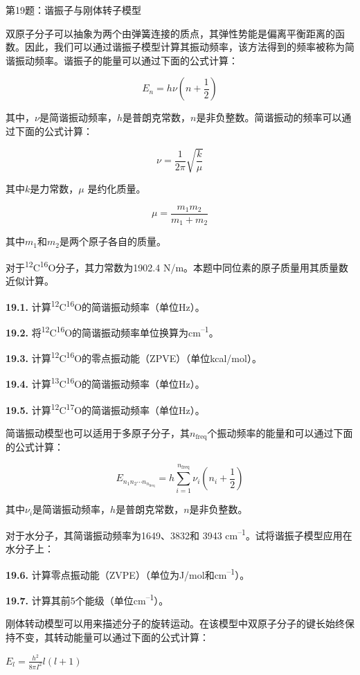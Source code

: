 第19题：谐振子与刚体转子模型

双原子分子可以抽象为两个由弹簧连接的质点，其弹性势能是偏离平衡距离的函数。因此，我们可以通过谐振子模型计算其振动频率，该方法得到的频率被称为简谐振动频率。谐振子的能量可以通过下面的公式计算：

\[E_n=h\nu (n+\frac{1}{2})\]

其中，\(\nu\)是简谐振动频率，\(h\)是普朗克常数，\(n\)是非负整数。简谐振动的频率可以通过下面的公式计算：

\[\nu = \frac{1}{2\pi} \sqrt{\frac{k}{\mu}}\]

其中\(k\)是力常数，\(\mu\) 是约化质量。

\[\mu=\frac{m_1m_2}{m_1+m_2}\]

其中\(m_1\)和\(m_2\)是两个原子各自的质量。

对于\textsuperscript{12}C\textsuperscript{16}O分子，其力常数为1902.4
N/m。本题中同位素的原子质量用其质量数近似计算。

\textbf{19.1.}
计算\textsuperscript{12}C\textsuperscript{16}O的简谐振动频率（单位Hz）。

\textbf{19.2.}
将\textsuperscript{12}C\textsuperscript{16}O的简谐振动频率单位换算为cm\textsuperscript{--1}。

\textbf{19.3.}
计算\textsuperscript{12}C\textsuperscript{16}O的零点振动能（ZPVE）（单位kcal/mol）。

\textbf{19.4.}
计算\textsuperscript{13}C\textsuperscript{16}O的简谐振动频率（单位Hz）。

\textbf{19.5.}
计算\textsuperscript{12}C\textsuperscript{17}O的简谐振动频率（单位Hz）。

简谐振动模型也可以适用于多原子分子，其\(n_{\mathrm{freq}}\)个振动频率的能量和可以通过下面的公式计算：

\[E_{n_1n_2\cdots n_{n_{\mathrm{freq}}}} = h\sum^{n_{\mathrm{freq}}}_{i=1} \nu_i
(n_i + \frac{1}{2})\]

其中\(\nu_i\)是简谐振动频率，\(h\)是普朗克常数，\(n\)是非负整数。

对于水分子，其简谐振动频率为1649、3832和 3943
cm\textsuperscript{--1}。试将谐振子模型应用在水分子上：

\textbf{19.6.}
计算零点振动能（ZVPE）（单位为J/mol和cm\textsuperscript{--1}）。

\textbf{19.7.} 计算其前5个能级（单位cm\textsuperscript{--1}）。

刚体转动模型可以用来描述分子的旋转运动。在该模型中双原子分子的键长始终保持不变，其转动能量可以通过下面的公式计算：

\(E_l = \frac{h^2}{8\pi I^2} l (l+1)\)

